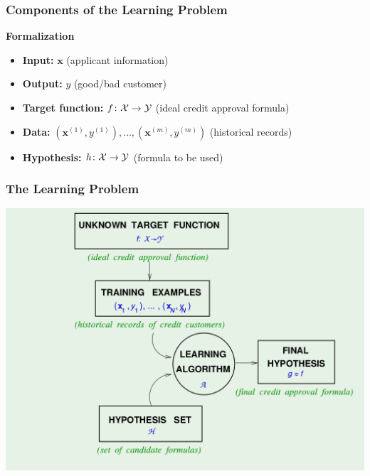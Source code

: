 \documentclass[xcolor=table]{beamer}
\newcommand{\vect}[1]{\ensuremath{\mathbf{#1}}}
\newcommand{\calX}{\ensuremath{{\cal X}}}
\newcommand{\calY}{\ensuremath{{\cal Y}}}
\begin{document}
\begin{frame}[t]
\frametitle{Components of the Learning Problem}

\textbf{Formalization}

\begin{itemize}
    \item \textbf{Input:} $\vect{x}$ (applicant information)

    \pause

    \item \textbf{Output:} $y$ (good/bad customer)
    
    \pause

    \item \textbf{Target function:} $f \colon \calX \rightarrow \calY$ (ideal credit
    approval formula)
    
    \pause

    \item \textbf{Data:} $(\vect{x}^{(1)}, y^{(1)}), \ldots, (\vect{x}^{(m)},
    y^{(m)})$ (historical records)
    
    \pause

    \item \textbf{Hypothesis:} $h \colon \calX \rightarrow \calY$ (formula to be used)
\end{itemize} 
\end{frame}

\begin{frame}[t]
\frametitle{The Learning Problem}
\begin{center}
\includegraphics[scale=0.25]{the_learning_problem.png}
\end{center}
\end{frame}
\end{document}
